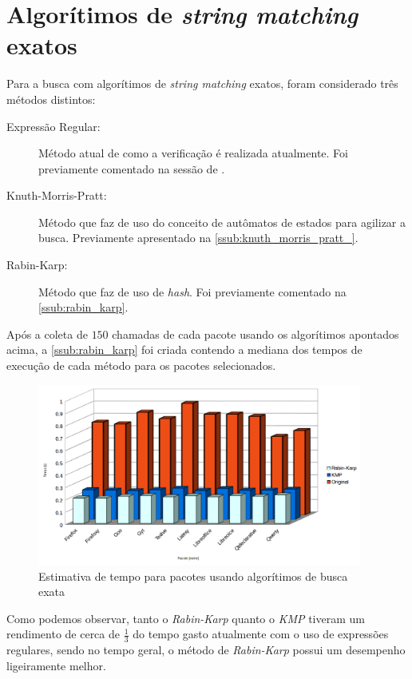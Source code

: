 
\section{\nmu Algorítimos de \textit{string matching} exatos} %
\label{sec:algor_timos_de_string_matching_exatos}

Para a busca com algorítimos de \textit{string matching} exatos, foram considerado três métodos distintos:

\begin{description}
	\item[Expressão Regular:] Método atual de como a verificação é realizada atualmente. Foi previamente comentado na sessão de .
	\item[Knuth-Morris-Pratt:] Método que faz de uso do conceito de autômatos de estados para agilizar a busca. Previamente apresentado na \autoref{ssub:knuth_morris_pratt_}.
	\item[Rabin-Karp:]  Método que faz de uso de \textit{hash}. Foi previamente comentado na \autoref{ssub:rabin_karp}.
\end{description}

Após a coleta de $150$ chamadas de cada pacote usando os algorítimos apontados acima, a \autoref{ssub:rabin_karp} foi criada contendo a mediana dos tempos de execução de cada método para os pacotes selecionados.

\begin{figure}[htbp]
  \centering
  \includegraphics[width=0.95\textwidth]{figuras/tempo-rk_kmp_std}
  \caption{Estimativa de tempo para pacotes usando algorítimos de busca exata}
  \label{tempo_rk_kmp_std}
\end{figure}

Como podemos observar, tanto o \textit{Rabin-Karp} quanto o \textit{KMP} tiveram um rendimento de cerca de $\frac{1}{3}$ do tempo gasto atualmente com o uso de expressões regulares, sendo no tempo geral, o método de \textit{Rabin-Karp} possui um desempenho ligeiramente melhor.


